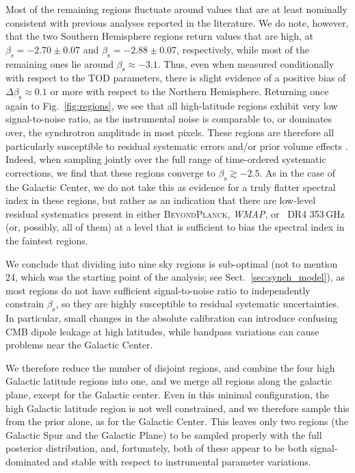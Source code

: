 \documentclass[twocolumn]{aa}
\def\WMAP{\textit{WMAP}}
\newcommand{\BP}{\textsc{BeyondPlanck}}
\newcommand{\?}[1]{\textcolor{red}{{\bf [#1]}}}
\begin{document}
Most of the remaining regions fluctuate around values that are at least
nominally consistent with previous analyses reported in the literature. We do
note, however, that the two Southern Hemisphere regions return values that are
high, at $\beta_{\mathrm{s}}=-2.70\pm0.07$ and
$\beta_{\mathrm{s}}=-2.88\pm0.07$, respectively, while most of the remaining
ones lie around $\beta_{\mathrm{s}}\approx-3.1$. Thus, even when measured
conditionally with respect to the TOD parameters, there is slight evidence of a
positive bias of $\Delta\beta_{\mathrm{s}}\approx0.1$ or more with respect to
the Northern Hemisphere. Returning once again to Fig.~\ref{fig:regions}, we see
that all high-latitude regions exhibit very low signal-to-noise ratio, as the
instrumental noise is comparable to, or dominates over, the synchrotron
amplitude in most pixels. These regions are therefore all particularly
susceptible to residual systematic errors and/or prior volume effects
\citep[e.g.,][]{dunkley2009}. Indeed, when sampling jointly over the full range
of time-ordered systematic corrections, we find that these regions converge to
$\beta_{\mathrm{s}}\gtrsim-2.5$. As in the case of the Galactic Center, we do
not take this as evidence for a truly flatter spectral index in these regions,
but rather as an indication that there are low-level residual systematics
present in either \BP, \WMAP, or \Planck\ DR4 353\,GHz (or, possibly, all of them) at
a level that is sufficient to bias the spectral index in the faintest regions. 

We conclude that dividing into nine sky regions is sub-optimal (not to
mention 24, which was the starting point of the analysis; see
Sect.~\ref{sec:synch_model}), as most regions do not have sufficient
signal-to-noise ratio to independently constrain $\beta_{\mathrm{s}}$,
so they are highly susceptible to residual systematic
uncertainties. In particular, small changes in the absolute
calibration can introduce confusing CMB dipole leakage at high
latitudes, while bandpass variations can cause problems near the
Galactic Center. 

We therefore reduce the number of disjoint regions, and
combine the four high Galactic latitude regions into one, and we merge
all regions along the galactic plane, except for the Galactic
center. Even in this minimal configuration, the high Galactic latitude
region is not well constrained, and we therefore sample this from the
prior alone, as for the Galactic Center. This leaves only two regions
(the Galactic Spur and the Galactic Plane) to be sampled
properly with the full posterior distribution, and, fortunately, both
of these appear to be both signal-dominated and stable with respect to
instrumental parameter variations.
\end{document}
